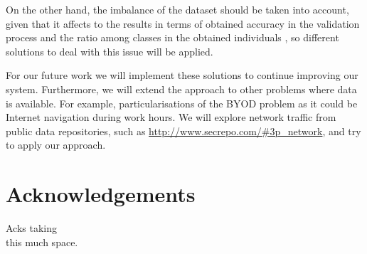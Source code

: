 \documentclass[runningheads]{llncs}
\begin{document}
On the other hand, the imbalance of the dataset should be taken into
account, given that it affects to the results in terms of obtained
accuracy in the validation process and the ratio among classes in the
obtained individuals \cite{Pereira19RuleExtractionProblems}, so different solutions to deal with this issue will be applied. 

For our future work we will implement these solutions to continue
improving our system. Furthermore, we will extend the approach to other problems where data is available. For example, particularisations of the BYOD problem as it could be Internet navigation during work hours. We will explore network traffic from public data repositories, such as \url{http://www.secrepo.com/#3p_network}, and try to apply our approach. 

\section{Acknowledgements}

Acks taking\\
this much space.

      
   
\end{document}
